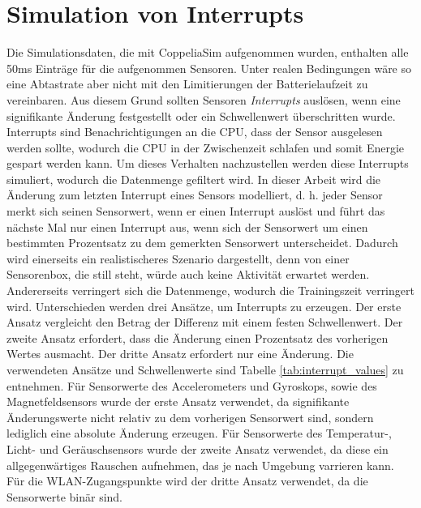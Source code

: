 \section{Simulation von Interrupts}
Die Simulationsdaten, die mit CoppeliaSim aufgenommen wurden, enthalten alle 50ms Einträge für die aufgenommen Sensoren.
Unter realen Bedingungen wäre so eine Abtastrate aber nicht mit den Limitierungen der Batterielaufzeit zu vereinbaren.
Aus diesem Grund sollten Sensoren \textit{Interrupts} auslösen, wenn eine signifikante Änderung festgestellt oder ein Schwellenwert überschritten wurde.
Interrupts sind Benachrichtigungen an die CPU, dass der Sensor ausgelesen werden sollte, wodurch die CPU in der Zwischenzeit schlafen und somit Energie gespart werden kann.
\newline
\newline
Um dieses Verhalten nachzustellen werden diese Interrupts simuliert, wodurch die Datenmenge gefiltert wird.
In dieser Arbeit wird die Änderung zum letzten Interrupt eines Sensors modelliert,
d. h. jeder Sensor merkt sich seinen Sensorwert, wenn er einen Interrupt auslöst
und führt das nächste Mal nur einen Interrupt aus, wenn sich der Sensorwert um einen bestimmten Prozentsatz zu dem gemerkten Sensorwert unterscheidet.
\newpage
Dadurch wird einerseits ein realistischeres Szenario dargestellt,
denn von einer Sensorenbox, die still steht, würde auch keine Aktivität erwartet werden.
Andererseits verringert sich die Datenmenge, wodurch die Trainingszeit verringert wird.
\newline
\newline
Unterschieden werden drei Ansätze, um Interrupts zu erzeugen.
Der erste Ansatz vergleicht den Betrag der Differenz mit einem festen Schwellenwert.
Der zweite Ansatz erfordert, dass die Änderung einen Prozentsatz des vorherigen Wertes ausmacht.
Der dritte Ansatz erfordert nur eine Änderung.
\newline
\newline
Die verwendeten Ansätze und Schwellenwerte sind Tabelle \ref{tab:interrupt_values} zu entnehmen.
Für Sensorwerte des Accelerometers und Gyroskops, sowie des Magnetfeldsensors wurde der erste Ansatz verwendet,
da signifikante Änderungswerte nicht relativ zu dem vorherigen Sensorwert sind, sondern lediglich eine absolute Änderung erzeugen.
Für Sensorwerte des Temperatur-, Licht- und Geräuschsensors wurde der zweite Ansatz verwendet,
da diese ein allgegenwärtiges Rauschen aufnehmen, das je nach Umgebung varrieren kann.
Für die WLAN-Zugangspunkte wird der dritte Ansatz verwendet, da die Sensorwerte binär sind.
